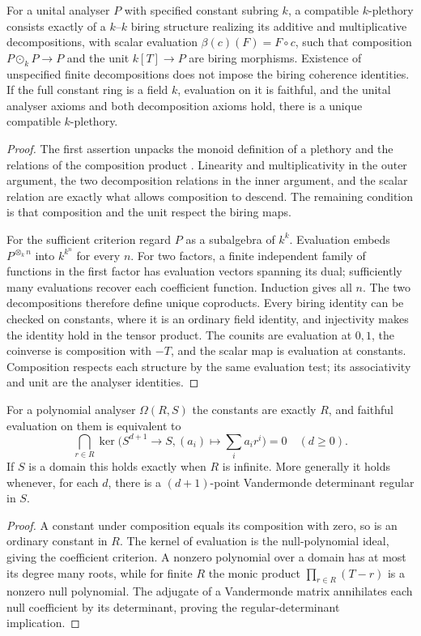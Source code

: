 \begin{theorem}\label{thm:analyser-to-plethory}
For a unital analyser $P$ with specified constant subring $k$, a
compatible $k$-plethory consists exactly of a $k$--$k$ biring
structure realizing its additive and multiplicative decompositions,
with scalar evaluation $\beta(c)(F)=F\circ c$, such that composition
$P\odot_kP\to P$ and the unit $k[T]\to P$ are biring morphisms.
Existence of unspecified finite decompositions does not impose the
biring coherence identities. If the full constant ring is a field
$k$, evaluation on it is faithful, and the unital analyser axioms
and both decomposition axioms hold, there is a unique compatible
$k$-plethory.
\end{theorem}
\begin{proof}
The first assertion unpacks the monoid definition of a plethory
and the relations of the composition product
\cite[1.1, 1.3, 1.8]{BorgerWieland2005}. Linearity and
multiplicativity in the outer argument, the two decomposition
relations in the inner argument, and the scalar relation are
exactly what allows composition to descend. The remaining
condition is that composition and the unit respect the biring maps.

For the sufficient criterion regard $P$ as a subalgebra of $k^k$.
Evaluation embeds $P^{\otimes_k n}$ into $k^{k^n}$ for every $n$.
For two factors, a finite independent family of functions in the
first factor has evaluation vectors spanning its dual; sufficiently
many evaluations recover each coefficient function. Induction
gives all $n$. The two decompositions therefore define unique
coproducts. Every biring identity can be checked on constants,
where it is an ordinary field identity, and injectivity makes
the identity hold in the tensor product. The counits are
evaluation at $0,1$, the coinverse is composition with $-T$,
and the scalar map is evaluation at constants. Composition
respects each structure by the same evaluation test; its
associativity and unit are the analyser identities.
\end{proof}

\begin{proposition}\label{prop:constant-evaluation-criterion}
For a polynomial analyser $\Omega(R,S)$ the constants are exactly
$R$, and faithful evaluation on them is equivalent to
\[
 \bigcap_{r\in R}\ker\bigl(S^{d+1}\to S,
                   (a_i)\mapsto\sum_i a_ir^i\bigr)=0
                            \quad(d\ge0).
\]
If $S$ is a domain this holds exactly when $R$ is infinite.
More generally it holds whenever, for each $d$, there is a
$(d+1)$-point Vandermonde determinant regular in $S$.
\end{proposition}
\begin{proof}
A constant under composition equals its composition with zero,
so is an ordinary constant in $R$. The kernel of evaluation is
the null-polynomial ideal, giving the coefficient criterion.
A nonzero polynomial over a domain has at most its degree many
roots, while for finite $R$ the monic product
$\prod_{r\in R}(T-r)$ is a nonzero null polynomial. The adjugate
of a Vandermonde matrix annihilates each null coefficient by its
determinant, proving the regular-determinant implication.
\end{proof}

